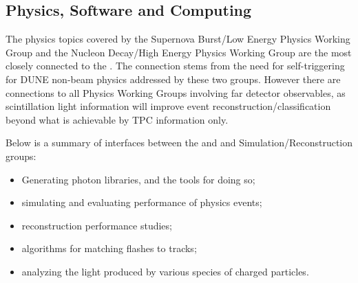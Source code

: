 \subsection{Physics, Software and Computing}


The physics topics covered by the Supernova Burst/Low Energy Physics Working Group and the Nucleon Decay/High Energy Physics Working Group are the most closely connected to the \single {}. The connection stems from the need for self-triggering for DUNE non-beam physics addressed by these two groups. 
However there are connections to all Physics Working Groups involving far detector observables, as scintillation light information will improve event reconstruction/classification beyond what is achievable by TPC information only. 




Below is a summary of interfaces between the \dune \single {} and  and  Simulation/Reconstruction groups:

\begin{itemize}
    \item Generating photon libraries, and the tools for doing so;
    \item simulating and evaluating performance of physics events;
    \item \single {} reconstruction performance studies;
    \item algorithms for matching flashes to  tracks;
    \item analyzing the light produced by various species of charged particles.
\end{itemize}




